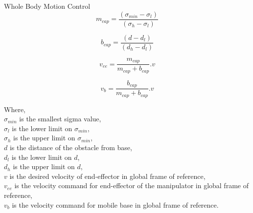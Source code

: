 \documentclass{beamer}
\begin{document}
	\begin{frame}{Whole Body Motion Control}
		\begin{equation}
		m_{cap} = \frac{(\sigma_{min} - \sigma_{l})}{(\sigma_{h} - \sigma_{l})}
		\end{equation}
		
		
		\begin{equation}
		b_{cap} = \frac{(d - d_{l})}{(d_{h} - d_{l})}
		\end{equation}
		
		
		\begin{equation}
		v_{ee} = \frac{m_{cap}}{m_{cap} + b_{cap}}.v
		\end{equation} 
		
		\begin{equation}
		v_{b} = \frac{b_{cap}}{m_{cap} + b_{cap}}.v
		\end{equation} 
	\end{frame}
	\begin{frame}
		Where, \\
		$\sigma_{min}$ is the smallest sigma value, \\
		$\sigma_{l}$ is the lower limit on $\sigma_{min}$, \\
		$\sigma_{h}$ is the upper limit on $\sigma_{min}$, \\
		$d$ is the distance of the obstacle from base, \\
		$d_{l}$ is the lower limit on $d$, \\
		$d_{h}$ is the upper limit on $d$, \\
		$v$ is the desired velocity of end-effector in global frame of reference, \\ 
		$v_{ee}$ is the velocity command for end-effector of the manipulator in global frame of reference, \\
		$v_{b}$ is the velocity command for mobile base in global frame of reference.

	\end{frame}
	
\end{document}
